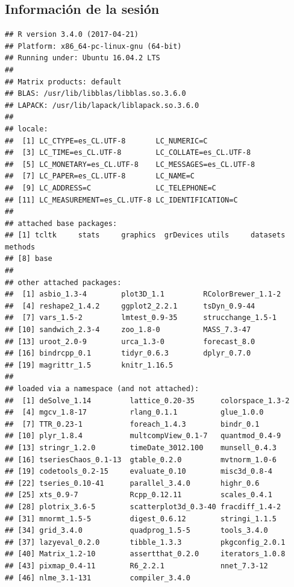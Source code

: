 \documentclass[12pt, twoside]{book}\usepackage[]{graphicx}\usepackage[]{color}
\makeatletter
\newenvironment{kframe}{%
 \def\at@end@of@kframe{}%
 \ifinner\ifhmode%
  \def\at@end@of@kframe{\end{minipage}}%
  \begin{minipage}{\columnwidth}%
 \fi\fi%
 \def\FrameCommand##1{\hskip\@totalleftmargin \hskip-\fboxsep
 \colorbox{shadecolor}{##1}\hskip-\fboxsep
     \hskip-\linewidth \hskip-\@totalleftmargin \hskip\columnwidth}%
 \MakeFramed {\advance\hsize-\width
   \@totalleftmargin\z@ \linewidth\hsize
   \@setminipage}}%
 {\par\unskip\endMakeFramed%
 \at@end@of@kframe}
\newenvironment{knitrout}{}{} %
\numberwithin{equation}{section}
\numberwithin{theorem}{section}
\numberwithin{teorema}{section}
\numberwithin{defi}{section}
\numberwithin{prop}{section}
\numberwithin{defi}{section}
\theoremstyle{plain}
\makeatother
\begin{document}
\subsection{Información de la sesión}
\begin{knitrout}\scriptsize
{}\color{fgcolor}\begin{kframe}
\begin{verbatim}
## R version 3.4.0 (2017-04-21)
## Platform: x86_64-pc-linux-gnu (64-bit)
## Running under: Ubuntu 16.04.2 LTS
## 
## Matrix products: default
## BLAS: /usr/lib/libblas/libblas.so.3.6.0
## LAPACK: /usr/lib/lapack/liblapack.so.3.6.0
## 
## locale:
##  [1] LC_CTYPE=es_CL.UTF-8       LC_NUMERIC=C              
##  [3] LC_TIME=es_CL.UTF-8        LC_COLLATE=es_CL.UTF-8    
##  [5] LC_MONETARY=es_CL.UTF-8    LC_MESSAGES=es_CL.UTF-8   
##  [7] LC_PAPER=es_CL.UTF-8       LC_NAME=C                 
##  [9] LC_ADDRESS=C               LC_TELEPHONE=C            
## [11] LC_MEASUREMENT=es_CL.UTF-8 LC_IDENTIFICATION=C       
## 
## attached base packages:
## [1] tcltk     stats     graphics  grDevices utils     datasets  methods  
## [8] base     
## 
## other attached packages:
##  [1] asbio_1.3-4        plot3D_1.1         RColorBrewer_1.1-2
##  [4] reshape2_1.4.2     ggplot2_2.2.1      tsDyn_0.9-44      
##  [7] vars_1.5-2         lmtest_0.9-35      strucchange_1.5-1 
## [10] sandwich_2.3-4     zoo_1.8-0          MASS_7.3-47       
## [13] uroot_2.0-9        urca_1.3-0         forecast_8.0      
## [16] bindrcpp_0.1       tidyr_0.6.3        dplyr_0.7.0       
## [19] magrittr_1.5       knitr_1.16.5      
## 
## loaded via a namespace (and not attached):
##  [1] deSolve_1.14         lattice_0.20-35      colorspace_1.3-2    
##  [4] mgcv_1.8-17          rlang_0.1.1          glue_1.0.0          
##  [7] TTR_0.23-1           foreach_1.4.3        bindr_0.1           
## [10] plyr_1.8.4           multcompView_0.1-7   quantmod_0.4-9      
## [13] stringr_1.2.0        timeDate_3012.100    munsell_0.4.3       
## [16] tseriesChaos_0.1-13  gtable_0.2.0         mvtnorm_1.0-6       
## [19] codetools_0.2-15     evaluate_0.10        misc3d_0.8-4        
## [22] tseries_0.10-41      parallel_3.4.0       highr_0.6           
## [25] xts_0.9-7            Rcpp_0.12.11         scales_0.4.1        
## [28] plotrix_3.6-5        scatterplot3d_0.3-40 fracdiff_1.4-2      
## [31] mnormt_1.5-5         digest_0.6.12        stringi_1.1.5       
## [34] grid_3.4.0           quadprog_1.5-5       tools_3.4.0         
## [37] lazyeval_0.2.0       tibble_1.3.3         pkgconfig_2.0.1     
## [40] Matrix_1.2-10        assertthat_0.2.0     iterators_1.0.8     
## [43] pixmap_0.4-11        R6_2.2.1             nnet_7.3-12         
## [46] nlme_3.1-131         compiler_3.4.0
\end{verbatim}
\end{kframe}
\end{knitrout}
\end{document}
